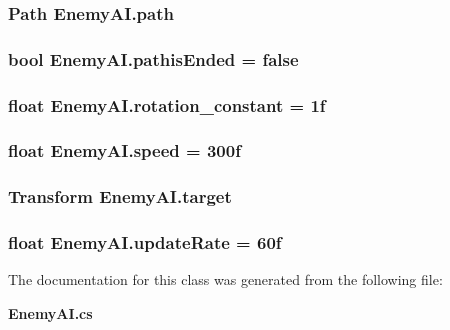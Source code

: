 \subsubsection[{path}]{\setlength{\rightskip}{0pt plus 5cm}Path Enemy\+A\+I.\+path}\label{class_enemy_a_i_a72c61c7f267c008607bf0c99b8073a17}
\subsubsection[{pathis\+Ended}]{\setlength{\rightskip}{0pt plus 5cm}bool Enemy\+A\+I.\+pathis\+Ended = false}\label{class_enemy_a_i_aad3d7c4f836a935a7627c69af5c9e01c}
\subsubsection[{rotation\+\_\+constant}]{\setlength{\rightskip}{0pt plus 5cm}float Enemy\+A\+I.\+rotation\+\_\+constant = 1f}\label{class_enemy_a_i_af84be5ba7eaa443312796b71b3ec9004}
\subsubsection[{speed}]{\setlength{\rightskip}{0pt plus 5cm}float Enemy\+A\+I.\+speed = 300f}\label{class_enemy_a_i_a5699bd8b917b94dc40bf0e9dd459f140}
\subsubsection[{target}]{\setlength{\rightskip}{0pt plus 5cm}Transform Enemy\+A\+I.\+target}\label{class_enemy_a_i_adaf416413d1142494609842a0873562e}
\subsubsection[{update\+Rate}]{\setlength{\rightskip}{0pt plus 5cm}float Enemy\+A\+I.\+update\+Rate = 60f}\label{class_enemy_a_i_a39c94a21b5cd2d5911fb12575584b461}


The documentation for this class was generated from the following file\+:\begin{DoxyCompactItemize}
\item 
{\bf Enemy\+A\+I.\+cs}\end{DoxyCompactItemize}
